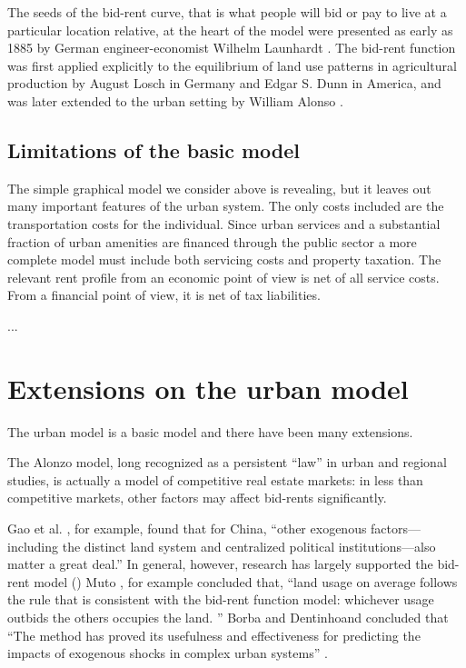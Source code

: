 The seeds of the \gls{bid-rent curve}, that is what people will bid or pay to live at a particular location relative, at the heart of the model were presented as early as 1885  by German engineer-economist Wilhelm Launhardt \cite{blaugEconomicTheoryRetrospect1985, launhardtMathematischeBegruendungVolkswirthschaftslehre1885}. The  \gls{bid-rent function} was first applied explicitly to the equilibrium of land use patterns in agricultural production by August Losch \cite{loschEconomicsLocation1954} in Germany and Edgar S. Dunn \cite{dunnEquilibriumLandUsePatterns1954} in America, and was later extended to the urban setting by William Alonso \cite{alonsoModelUrbanLand1960}. 
 
\subsection{Limitations of the basic model}
The simple graphical model we consider above is revealing, but it leaves out many important features of the urban system. The only costs included are the transportation costs for the individual.  Since urban services and  a substantial fraction of urban amenities are financed through the public sector a more complete model must include both servicing costs and property taxation. The relevant rent profile from an economic point of view is net of all service costs. From a financial point of view, it is net of tax liabilities.%

...

\section{Extensions on the urban model}

The urban model is a basic model and there have been many extensions. %

The Alonzo model, long  recognized as a persistent ``law'' in urban and regional studies, 
is actually a model of competitive real estate markets: in less than competitive markets, other factors may affect bid-rents significantly.

Gao et al. \cite{GaoJinlong2020BtbT}, for example,  found  that for China, ``other exogenous  factors---including the distinct land system  and centralized political institutions---also matter a great deal.'' In general, however, 
research has largely supported the bid-rent model (\cite{mutoEstimationBidRent2006, wheatonBidRentApproach1977}) Muto \cite{mutoEstimationBidRent2006}, for example concluded that,  ``land usage on average follows the rule that is consistent with the bid-rent function model: whichever usage outbids the others occupies the land. ''  Borba and Dentinhoand concluded that ``The method has proved its usefulness and effectiveness for predicting the impacts of exogenous shocks in complex urban systems'' \cite{borbaEvaluationUrbanScenarios2016}.  

